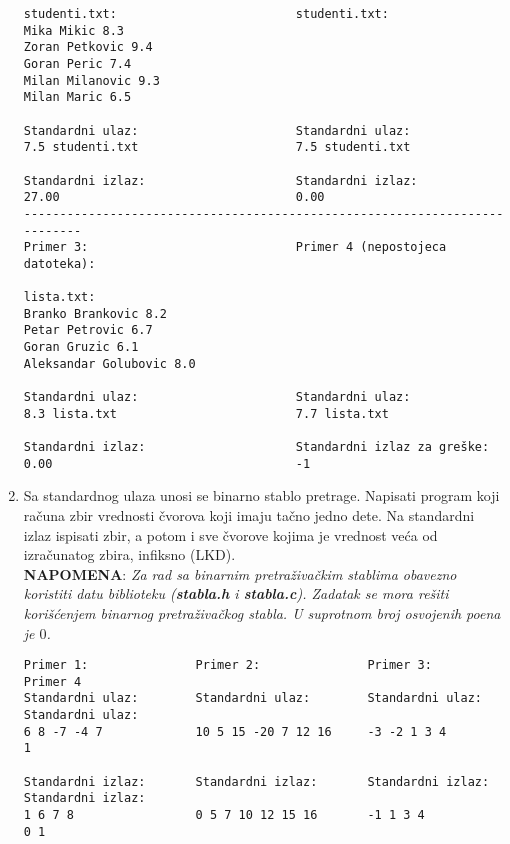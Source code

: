 \begin{enumerate}
\begin{verbatim}
studenti.txt:                         studenti.txt:
Mika Mikic 8.3
Zoran Petkovic 9.4
Goran Peric 7.4
Milan Milanovic 9.3
Milan Maric 6.5

Standardni ulaz:                      Standardni ulaz:      
7.5 studenti.txt                      7.5 studenti.txt

Standardni izlaz:                     Standardni izlaz:     
27.00                                 0.00
---------------------------------------------------------------------------
Primer 3:                             Primer 4 (nepostojeca datoteka):   

lista.txt:
Branko Brankovic 8.2
Petar Petrovic 6.7
Goran Gruzic 6.1
Aleksandar Golubovic 8.0

Standardni ulaz:                      Standardni ulaz:
8.3 lista.txt                         7.7 lista.txt

Standardni izlaz:                     Standardni izlaz za greške:
0.00                                  -1

\end{verbatim}

\item Sa standardnog ulaza unosi se binarno stablo pretrage. Napisati program koji računa zbir vrednosti čvorova koji imaju tačno jedno dete. Na standardni izlaz ispisati zbir, a potom i sve čvorove kojima je vrednost veća od izračunatog zbira, infiksno (LKD).\\
\textbf{NAPOMENA}:\textit{ Za rad sa binarnim pretraživačkim stablima obavezno koristiti datu biblioteku (\textbf{stabla.h} i \textbf{stabla.c}). Zadatak se mora rešiti korišćenjem binarnog pretraživačkog stabla. U suprotnom broj osvojenih poena je $0$.}
\begin{verbatim}
Primer 1:               Primer 2:               Primer 3:            Primer 4            
Standardni ulaz:        Standardni ulaz:        Standardni ulaz:     Standardni ulaz:
6 8 -7 -4 7             10 5 15 -20 7 12 16     -3 -2 1 3 4          1

Standardni izlaz:       Standardni izlaz:       Standardni izlaz:    Standardni izlaz:
1 6 7 8                 0 5 7 10 12 15 16       -1 1 3 4             0 1
\end{verbatim}  
 
\end{enumerate}	
